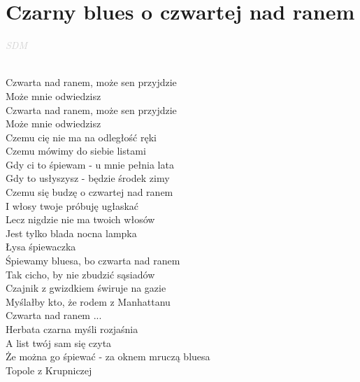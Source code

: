 \documentclass[a5paper, 10pt]{book}
\begin{document}
\section{Czarny blues o czwartej nad ranem}\textcolor{lightgray}{\textit{SDM}}\\~\\
\begin{minipage}[t]{0.7\textwidth}

  \hspace*{4mm} Czwarta nad ranem, może sen przyjdzie\\
  \hspace*{4mm} Może mnie odwiedzisz\\
  \hspace*{4mm} Czwarta nad ranem, może sen przyjdzie\\
  \hspace*{4mm} Może mnie odwiedzisz\\

  Czemu cię nie ma na odległość ręki\\
  Czemu mówimy do siebie listami\\
  Gdy ci to śpiewam - u mnie pełnia lata\\
  Gdy to usłyszysz - będzie środek zimy\\

  Czemu się budzę o czwartej nad ranem\\
  I włosy twoje próbuję ugłaskać\\
  Lecz nigdzie nie ma twoich włosów\\
  Jest tylko blada nocna lampka\\
  Łysa śpiewaczka\\

  Śpiewamy bluesa, bo czwarta nad ranem\\
  Tak cicho, by nie zbudzić sąsiadów\\
  Czajnik z gwizdkiem świruje na gazie\\
  Myślałby kto, że rodem z Manhattanu\\

  \hspace*{4mm} Czwarta nad ranem ... \\

  Herbata czarna myśli rozjaśnia\\
  A list twój sam się czyta\\
  Że można go śpiewać - za oknem mruczą bluesa\\
  Topole z Krupniczej\\


\end{minipage}
\end{document}
